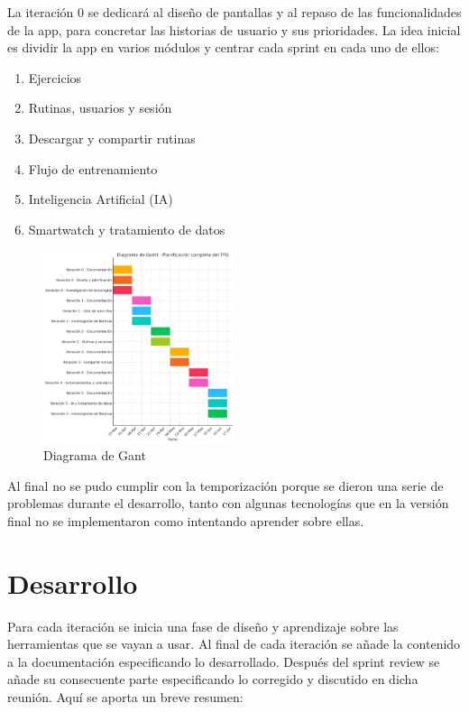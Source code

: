La iteración 0 se dedicará al diseño de pantallas y al repaso de las funcionalidades de la app, para concretar las historias de usuario y sus prioridades. La idea inicial es dividir la app en varios módulos y centrar cada sprint en cada uno de ellos:

\begin{enumerate}
  \item Ejercicios
  \item Rutinas, usuarios y sesión
  \item Descargar y compartir rutinas
  \item Flujo de entrenamiento
  \item Inteligencia Artificial (IA)
  \item Smartwatch y tratamiento de datos
\end{enumerate}

\begin{figure}[H]
   \centering
    \includegraphics[width=0.5\textwidth]{tablas/gant.png}
    \caption{Diagrama de Gant}
    \label{fig:Gant}
\end{figure}

Al final no se pudo cumplir con la temporización porque se dieron una serie de problemas durante el desarrollo, tanto con algunas tecnologías que en la versión final no se implementaron como intentando aprender sobre ellas.

\section{Desarrollo}

Para cada iteración se inicia una fase de diseño y aprendizaje sobre las herramientas que se vayan a usar. Al final de cada iteración se añade la contenido a la documentación especificando lo desarrollado. Después del sprint review se añade su consecuente parte especificando lo corregido y discutido en dicha reunión. Aquí se aporta un breve resumen:

